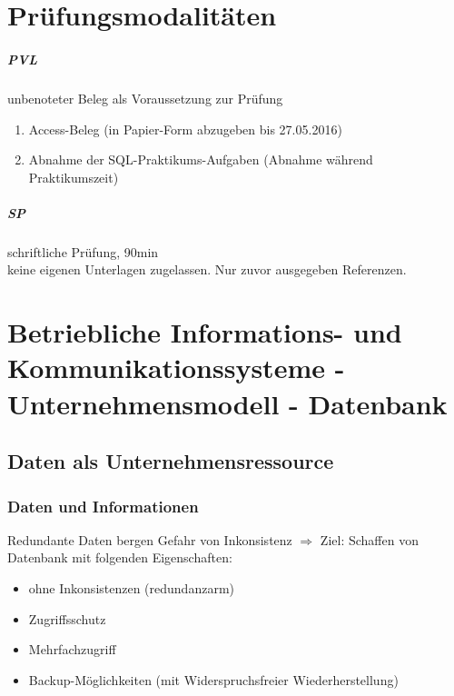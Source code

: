 

%


\newcommand{\folie}[2]{\begin{center}
\texttt{[image: Vorlesung/oneperpage/Kap\#1.pdf]}
\end{center}}

\maketitle
\newpage
\tableofcontents
\newpage

\chapter*{Prüfungsmodalitäten}
\paragraph{PVL} unbenoteter Beleg als Voraussetzung zur Prüfung
\begin{enumerate}
\item Access-Beleg (in Papier-Form abzugeben bis 27.05.2016)
\item Abnahme der SQL-Praktikums-Aufgaben (Abnahme während Praktikumszeit)
\end{enumerate}

\paragraph{SP} schriftliche Prüfung, 90min\\
keine eigenen Unterlagen zugelassen. Nur zuvor ausgegeben Referenzen.

\chapter[Datenbank als System und Modell]{Betriebliche Informations- und Kommunikationssysteme - Unternehmensmodell - Datenbank}

\section{Daten als Unternehmensressource}
\subsection{Daten und Informationen}
Redundante Daten bergen Gefahr von Inkonsistenz $\Rightarrow$ Ziel: Schaffen von Datenbank mit folgenden Eigenschaften:
\begin{itemize}
\item ohne Inkonsistenzen (redundanzarm)
\item Zugriffsschutz
\item Mehrfachzugriff
\item Backup-Möglichkeiten (mit Widerspruchsfreier Wiederherstellung)
\end{itemize}

